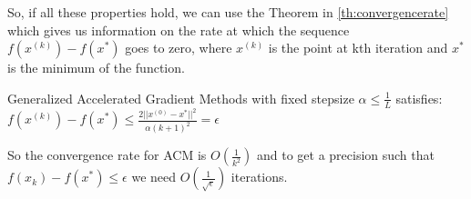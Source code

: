 So, if all these properties hold, we can use the Theorem in \ref{th:convergencerate} which gives us information on the rate at which the sequence $f(x^{(k)}) - f(x^*)$ goes to zero, where $x^{(k)}$ is the point at kth iteration and $x^*$ is the minimum of the function.

\begin{theorem}
\label{th:convergencerate}
Generalized Accelerated Gradient Methods with fixed stepsize $\alpha \leq \frac{1}{L}$ satisfies: \\
$f(x^{(k)}) - f(x^*) \leq \frac{2 || x^{(0)} - x^* ||^2}{\alpha (k+1)^2} = \epsilon$

\end{theorem}

So the convergence rate for ACM is $O(\frac{1}{k^2})$ and to get a precision such that $f(x_k) - f(x^*) \leq \epsilon$ we need $O(\frac{1}{\sqrt{\epsilon}})$ iterations.

%



\newpage